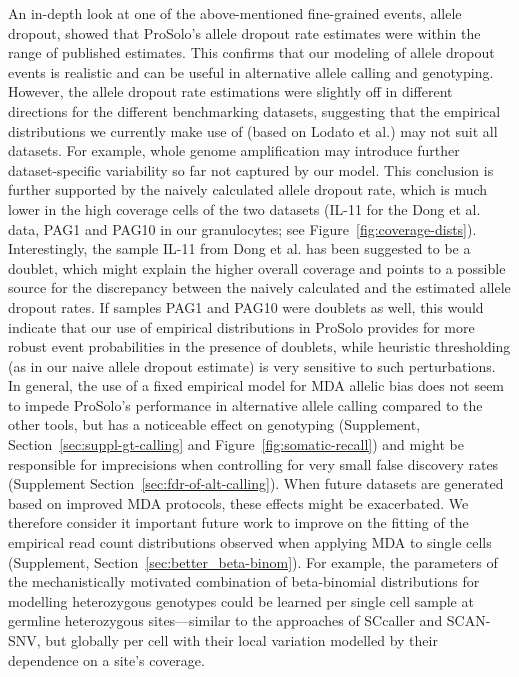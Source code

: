 \documentclass[12pt,inline]{wlscirep}
\begin{document}
An in-depth look at one of the above-mentioned fine-grained events, allele dropout, showed that ProSolo's allele dropout rate estimates were within the range of published estimates.
This confirms that our modeling of allele dropout events is realistic and can be useful in alternative allele calling and genotyping.
However, the allele dropout rate estimations were slightly off in different directions for the different benchmarking datasets, suggesting that the empirical distributions we currently make use of (based on Lodato et al.\cite{lodato_somatic_2015}) may not suit all datasets.
For example, whole genome amplification may introduce further dataset-specific variability so far not captured by our model.
This conclusion is further supported by the naively calculated allele dropout rate, which is much lower in the high coverage cells of the two datasets (IL-11 for the Dong et al. data\cite{dong_accurate_2017}, PAG1 and PAG10 in our granulocytes; see Figure~\ref{fig:coverage-dists}).
Interestingly, the sample IL-11 from Dong et al.\cite{dong_accurate_2017} has been suggested to be a doublet\cite{luquette_identification_2019}, which might explain the higher overall coverage and points to a possible source for the discrepancy between the naively calculated and the estimated allele dropout rates.
If samples PAG1 and PAG10 were doublets as well, this would indicate that our use of empirical distributions in ProSolo provides for more robust event probabilities in the presence of doublets, while heuristic thresholding (as in our naive allele dropout estimate) is very sensitive to such perturbations.
In general, the use of a fixed empirical model for MDA allelic bias does not seem to impede ProSolo's performance in alternative allele calling compared to the other tools, but has a noticeable effect on genotyping (Supplement, Section~\ref{sec:suppl-gt-calling} and Figure~\ref{fig:somatic-recall}) and might be responsible for imprecisions when controlling for very small false discovery rates (Supplement Section~\ref{sec:fdr-of-alt-calling}).
When future datasets are generated based on improved MDA protocols\cite{lahnemann_eleven_2020}, these effects might be exacerbated.
We therefore consider it important future work to improve on the fitting of the empirical read count distributions observed when applying MDA to single cells (Supplement, Section~\ref{sec:better_beta-binom}).
For example, the parameters of the mechanistically motivated combination of beta-binomial distributions for modelling heterozygous genotypes could be learned per single cell sample at germline heterozygous sites---similar to the approaches of SCcaller and SCAN-SNV, but globally per cell with their local variation modelled by their dependence on a site's coverage.
\end{document}
